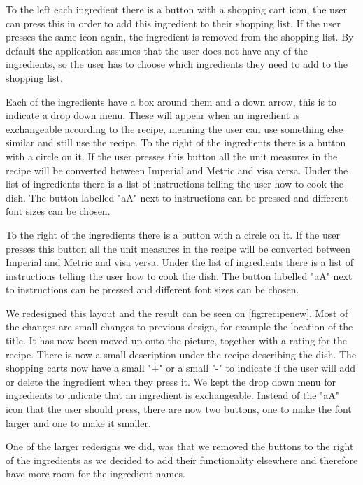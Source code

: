 To the left each ingredient there is a button with a shopping cart icon, the user can press this in order to add this ingredient to their shopping list. If the user presses the same icon again, the ingredient is removed from the shopping list. By default the application assumes that the user does not have any of the ingredients, so the user has to choose which ingredients they need to add to the shopping list.

Each of the ingredients have a box around them and a down arrow, this is to indicate a drop down menu. These will appear when an ingredient is exchangeable according to the recipe, meaning the user can use something else similar and still use the recipe. To the right of the ingredients there is a button with a circle on it. If the user presses this button all the unit measures in the recipe will be converted between Imperial and Metric and visa versa. Under the list of ingredients there is a list of instructions telling the user how to cook the dish. The button labelled "aA" next to instructions can be pressed and different font sizes can be chosen.

To the right of the ingredients there is a button with a circle on it. If the user presses this button all the unit measures in the recipe will be converted between Imperial and Metric and visa versa. Under the list of ingredients there is a list of instructions telling the user how to cook the dish. The button labelled "aA" next to instructions can be pressed and different font sizes can be chosen.

We redesigned this layout and the result can be seen on \autoref{fig:recipenew}. Most of the changes are small changes to previous design, for example the location of the title. It has now been moved up onto the picture, together with a rating for the recipe. There is now a small description under the recipe describing the dish. The shopping carts now have a small "+" or a small "-" to indicate if the user will add or delete the ingredient when they press it. We kept the drop down menu for ingredients to indicate that an ingredient is exchangeable. Instead of the "aA" icon that the user should press, there are now two buttons, one to make the font larger and one to make it smaller.

One of the larger redesigns we did, was that we removed the buttons to the right of the ingredients as we decided to add their functionality elsewhere and therefore have more room for the ingredient names.

